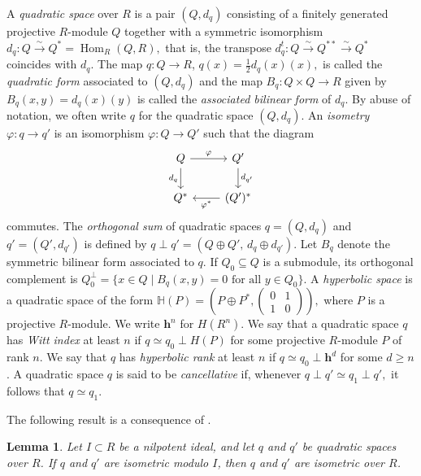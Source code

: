 \documentclass[11pt,a4paper]{amsart}
\theoremstyle{plain}
\newtheorem{lem}[thm]{Lemma}
\theoremstyle{definition}
\theoremstyle{remark}
\begin{document}
A \emph{quadratic space} over $R$ is a pair $(Q,d_q)$ consisting of a finitely generated projective $R$-module $Q$ together with a symmetric isomorphism $d_q:Q\xrightarrow{\sim}Q^*=\operatorname{Hom}_R(Q,R),$
that is, the transpose
$d_q^t:Q\xrightarrow{\sim}Q^{**}\xrightarrow{\sim}Q^*$ coincides with $d_q$. The map $
q:Q\to R$,  $q(x)=\frac{1}{2}d_q(x)(x),$ is called the \emph{quadratic form} associated to $(Q,d_q)$ and the map $B_q: Q\times Q\rightarrow R$ given by $B_q(x,y)=d_q(x)(y)$ is called the \emph{associated bilinear form} of $d_q$. By abuse of notation, we often write $q$ for the quadratic space $(Q,d_q)$.
An \emph{isometry} $\varphi:q\to q'$ is an isomorphism $\varphi:Q\to Q'$ such that the diagram
\[
\begin{tikzcd}
	Q & {Q'} \\
	{Q^*} & {(Q')^*}
	\arrow["\varphi", from=1-1, to=1-2]
	\arrow["{d_q}"', from=1-1, to=2-1]
	\arrow["{d_{q'}}", from=1-2, to=2-2]
	\arrow["{\varphi^*}", from=2-2, to=2-1]
\end{tikzcd}
\]
commutes. The \emph{orthogonal sum} of quadratic spaces $q=(Q,d_q)$ and $q'=(Q',d_{q'})$ is defined by $
q\perp q'=(Q\oplus Q',\, d_q\oplus d_{q'}).$ Let $B_q$ denote the symmetric bilinear form associated to $q$. If $Q_0\subseteq Q$ is a submodule, its orthogonal complement is
$
Q_0^{\perp}=\{x\in Q\mid B_q(x,y)=0 \text{ for all } y\in Q_0\}
$. A \emph{hyperbolic space} is a quadratic space of the form
$
\mathbb H(P)=
(P\oplus P^*,
\begin{pmatrix}
0 & 1\\
1 & 0
\end{pmatrix}
),
$
where $P$ is a projective $R$-module. We write $\mathbf h^n$ for $H(R^n)$.
We say that a quadratic space $q$ has \emph{Witt index} at least $n$ if
$
q\simeq q_0\perp  H(P)
$
for some projective $R$-module $P$ of rank $n$. We say that $q$ has \emph{hyperbolic rank} at least $n$ if
$
q\simeq q_0\perp \mathbf h^d
$
for some $d\geq n$.
A quadratic space $q$ is said to be \emph{cancellative} if, whenever
$
q\perp q'\simeq q_1\perp q',
$
it follows that $q\simeq q_1$.

The following result is a consequence of \cite[Theorem 2]{wall1970classification}.

\begin{lem}\label{reduced}
Let $I\subset R$ be a nilpotent ideal, and let $q$ and $q'$ be quadratic spaces over $R$. If $q$ and $q'$ are isometric modulo $I$, then $q$ and $q'$ are isometric over $R$.
\end{lem}
\end{document}
